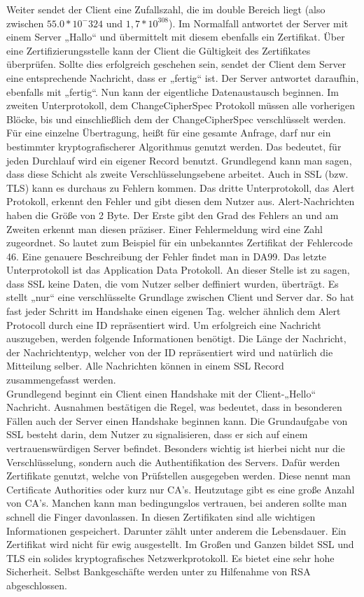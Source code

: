 Weiter sendet der Client eine Zufallszahl, die im double Bereich liegt (also zwischen $55.0*10^-324$ und $1,7*10^308$). Im Normalfall antwortet der Server mit einem Server „Hallo“ und übermittelt mit diesem ebenfalls ein Zertifikat. Über eine Zertifizierungsstelle kann der Client die Gültigkeit des Zertifikates überprüfen. Sollte dies erfolgreich geschehen sein, sendet der Client dem Server eine entsprechende Nachricht, dass er „fertig“ ist. Der Server antwortet daraufhin, ebenfalls mit „fertig“. Nun kann der eigentliche Datenaustausch beginnen. Im zweiten Unterprotokoll, dem ChangeCipherSpec Protokoll müssen alle vorherigen Blöcke, bis und einschließlich dem der ChangeCipherSpec verschlüsselt werden. Für eine einzelne Übertragung, heißt für eine gesamte Anfrage, darf nur ein bestimmter kryptografischerer Algorithmus genutzt werden. Das bedeutet, für jeden Durchlauf wird ein eigener Record benutzt. Grundlegend kann man sagen, dass diese Schicht als zweite Verschlüsselungsebene arbeitet. Auch in SSL (bzw. TLS) kann es durchaus zu Fehlern kommen. Das dritte Unterprotokoll, das Alert Protokoll, erkennt den Fehler und gibt diesen dem Nutzer aus. Alert-Nachrichten haben die Größe von 2 Byte. Der Erste gibt den Grad des Fehlers an und am Zweiten erkennt man diesen präziser. Einer Fehlermeldung wird eine Zahl zugeordnet. So lautet zum Beispiel für ein unbekanntes Zertifikat der Fehlercode 46. Eine genauere Beschreibung der Fehler findet man in DA99. Das letzte Unterprotokoll ist das Application Data Protokoll. An dieser Stelle ist zu sagen, dass SSL keine Daten, die vom Nutzer selber deffiniert wurden, überträgt. Es stellt „nur“ eine verschlüsselte Grundlage zwischen Client und Server dar. So hat fast jeder Schritt im Handshake einen eigenen Tag. welcher ähnlich dem Alert Protocoll durch eine ID repräsentiert wird. Um erfolgreich eine Nachricht auszugeben, werden folgende Informationen benötigt. Die Länge der Nachricht, der Nachrichtentyp, welcher von der ID repräsentiert wird und natürlich die Mitteilung selber. Alle Nachrichten können in einem SSL Record zusammengefasst werden. \\
Grundlegend beginnt ein Client einen Handshake mit der Client-„Hello“ Nachricht. Ausnahmen bestätigen die Regel, was bedeutet, dass in besonderen Fällen auch der Server einen Handshake beginnen kann. Die Grundaufgabe von SSL besteht darin, dem Nutzer zu signalisieren, dass er sich auf einem vertrauenswürdigen Server befindet. Besonders wichtig ist hierbei nicht nur die Verschlüsselung, sondern auch die Authentifikation des Servers. Dafür werden Zertifikate genutzt, welche von Prüfstellen ausgegeben werden. Diese nennt man Certificate Authorities oder kurz nur CA’s. Heutzutage gibt es eine große Anzahl von CA’s. Manchen kann man bedingungslos vertrauen, bei anderen sollte man schnell die Finger davonlassen. In diesen Zertifikaten sind alle wichtigen Informationen gespeichert. Darunter zählt unter anderem die Lebensdauer. Ein Zertifikat wird nicht für ewig ausgestellt.
Im Großen und Ganzen bildet SSL und TLS ein solides kryptografisches Netzwerkprotokoll. Es bietet eine sehr hohe Sicherheit. Selbst Bankgeschäfte werden unter zu Hilfenahme von RSA abgeschlossen.

